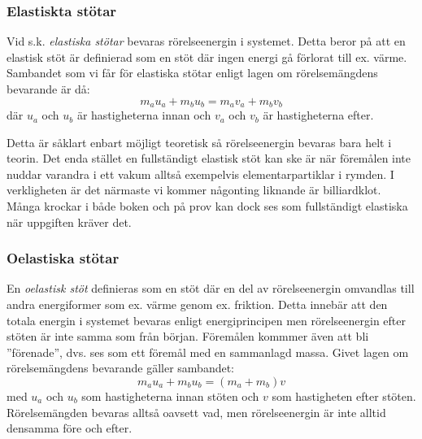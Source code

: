 \subsubsection{Elastiskta stötar}
Vid s.k. \emph{elastiska stötar} bevaras rörelseenergin i systemet. Detta beror på att en elastisk stöt är definierad som en stöt där ingen energi gå förlorat till ex. värme. Sambandet som vi får för elastiska stötar enligt lagen om rörelsemängdens bevarande är då:
\begin{equation*}
    m_au_a + m_bu_b = m_av_a + m_bv_b
\end{equation*} 
där $u_a$ och $u_b$ är hastigheterna innan och $v_a$ och $v_b$ är hastigheterna efter. 

Detta är såklart enbart möjligt teoretisk så rörelseenergin bevaras bara helt i teorin. Det enda stället en fullständigt elastisk stöt kan ske är när föremålen inte nuddar varandra i ett vakum alltså exempelvis elementarpartiklar i rymden. I verkligheten är det närmaste vi kommer någonting liknande är billiardklot. Många krockar i både boken och på prov kan dock ses som fullständigt elastiska när uppgiften kräver det.
\subsubsection{Oelastiska stötar}
En \emph{oelastisk stöt} definieras som en stöt där en del av rörelseenergin omvandlas till andra energiformer som ex. värme genom ex. friktion. Detta innebär att den totala energin i systemet bevaras enligt energiprincipen men rörelseenergin efter stöten är inte samma som från början. Föremålen kommmer även att bli ''förenade'', dvs. ses som ett föremål med en sammanlagd massa. Givet lagen om rörelsemängdens bevarande gäller sambandet:
\begin{equation*}
    m_au_a + m_bu_b = (m_a + m_b)v
\end{equation*}
med $u_a$ och $u_b$ som hastigheterna innan stöten och $v$ som hastigheten efter stöten. Rörelsemängden bevaras alltså oavsett vad, men rörelseenergin är inte alltid densamma före och efter.